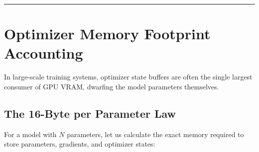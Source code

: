 \documentclass[
  letterpaper,
]{scrbook}
\begin{document}
\begin{center}\rule{0.5\linewidth}{0.5pt}\end{center}

\section{Optimizer Memory Footprint
Accounting}\label{optimizer-memory-footprint-accounting}

In large-scale training systems, optimizer state buffers are often the
single largest consumer of GPU VRAM, dwarfing the model parameters
themselves.

\subsection{The 16-Byte per Parameter
Law}\label{the-16-byte-per-parameter-law}

For a model with \(N\) parameters, let us calculate the exact memory
required to store parameters, gradients, and optimizer states:
\end{document}
